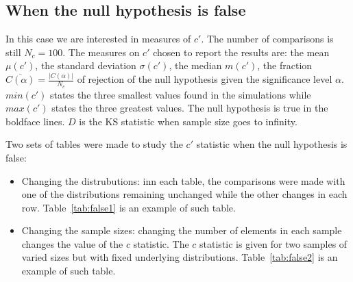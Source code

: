 \documentclass[12pt,fleqn]{article}
\begin{document}


\subsection{When the null hypothesis is false}\label{sec:false}
In this case we are interested in measures of $c'$.
The number of comparisons is still $N_c=100$.
The measures on $c'$ chosen to report the results are:
the mean $\mu(c')$, the standard deviation $\sigma(c')$,
the median $m(c')$,
the  fraction
$\overline{C(\alpha)}=\frac{|C(\alpha)|}{N_c}$
of rejection of the null hypothesis given the significance level $\alpha$.
$min(c')$ states the three smallest values found in the simulations while
$max(c')$ states the three greatest values.
The null hypothesis is true in the boldface lines.
$D$ is the KS statistic when sample size goes to infinity.

Two sets of tables were made to study the $c'$ statistic when
the null hypothesis is false:
\begin{itemize}
	\item Changing the distrubutions: inn each table, the comparisons were made with
one of the distributions remaining unchanged
while the other changes in each row.
Table~\ref{tab:false1} is an example of such table.
	\item Changing the sample sizes:
		changing the number of elements in each sample
		changes the value of the $c$ statistic. 
		The $c$ statistic is given for two samples of varied sizes but
		with fixed underlying distributions.         
		Table~\ref{tab:false2} is an example of such table.
\end{itemize}



\end{document}
